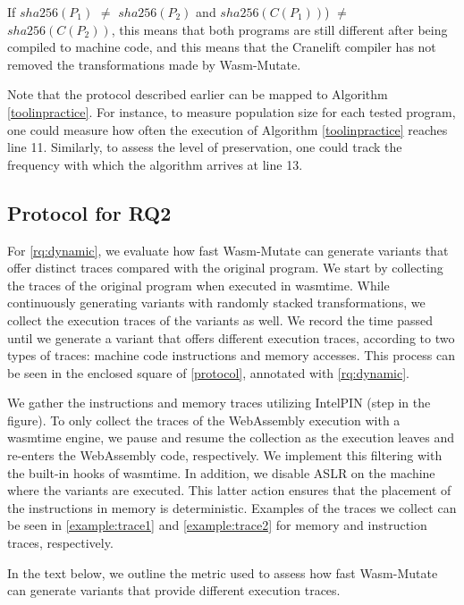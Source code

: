 \documentclass[a4paper,fleqn]{cas-dc}
\newcommand{\tool}{{\sc Wasm-Mutate}\xspace}
\newcommand{\Wasm}{WebAssembly\xspace}
\newcommand*\step[1]{
\noindent\tikz[baseline=(char.base)]{
        \node[shape=circle,text=black,draw=black, fill=white,inner sep=1.2pt] (char) {#1};}}
\begin{document}
If  $sha256(P_1)$ $\neq$ $sha256(P_2)$ and $sha256(C(P_1))$) $\neq$ $sha256(C(P_2))$, this means that both programs are still different after being compiled to machine code, and this means that the Cranelift compiler has not removed the transformations made by \tool.  

Note that the protocol described earlier can be mapped to Algorithm \autoref{toolinpractice}. 
For instance, to measure population size for each tested program, one could measure how often the execution of Algorithm \autoref{toolinpractice} reaches line 11. 
Similarly, to assess the level of preservation, one could track the frequency with which the algorithm arrives at line 13.

\subsection{Protocol for RQ2}
\newcommand{\samples}{100\xspace}

For \ref{rq:dynamic}, we evaluate how fast \tool can generate variants that offer distinct traces compared with the original program.
We start by collecting the traces of the original program when executed in wasmtime.
While continuously generating variants with randomly stacked transformations, we collect the execution traces of the variants as well.
We record the time passed until we generate a variant that offers different execution traces, according to two types of traces: machine code instructions and memory accesses.
This process can be seen in the enclosed square of \autoref{protocol}, annotated with \ref{rq:dynamic}.


We gather the instructions and memory traces utilizing IntelPIN \cite{luk2005pin, 10.1145/3478520} (step \step{4} in the figure).
To only collect the traces of the \Wasm execution with a wasmtime engine, we pause and resume the collection as the execution leaves and re-enters the \Wasm code, respectively.
We implement this filtering with the built-in hooks of wasmtime.
In addition, we disable ASLR on the machine where the variants are executed.
This latter action ensures that the placement of the instructions in memory is deterministic.
Examples of the traces we collect can be seen in \autoref{example:trace1} and \autoref{example:trace2} for memory and instruction traces, respectively.



In the text below, we outline the metric used to assess how fast \tool can generate variants that provide different execution traces.
\end{document}
